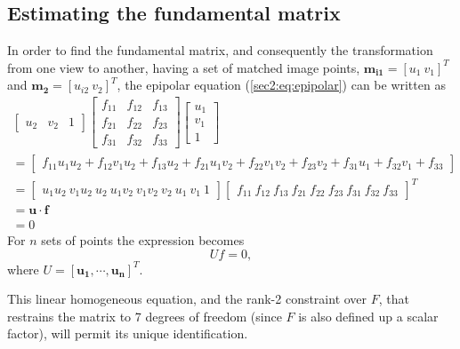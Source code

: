 \subsection{Estimating the fundamental matrix}
\label{einvonrev}
In order to find the fundamental matrix, and consequently the transformation from one view to another, having a set of matched image points, $\mathbf{m_{i1}} = [u_{1} \ v_{1}]^T$ and $\mathbf{m_{2}} = [u_{i2}  \ v_{2}]^T$, the epipolar equation (\ref{sec2:eq:epipolar}) can be written as
\begin{equation}
\begin{aligned}
\begin{bmatrix}
u_2 & v_2 & 1
\end{bmatrix}
\begin{bmatrix}
f_{11} & f_{12} & f_{13}  \\
f_{21} & f_{22} & f_{23}  \\
f_{31} & f_{32} & f_{33} 
\end{bmatrix}
\begin{bmatrix}
u_{1} \\ v_{1} \\ 1
\end{bmatrix}\\
=
\begin{bmatrix}
f_{11} u_1 u_2 + f_{12} v_1 u_2  + f_{13}u_2 + f_{21} u_1 v_2  + f_{22} v_1 v_2  + f_{23}v_2  + f_{31} u_1 + f_{32} v_1 + f_{33} 
\end{bmatrix}\\
=
\begin{bmatrix}
u_1u_2 \ v_1u_2 \ u_2 \ u_1v_2 \ v_1v_2 \  v_2 \ u_1 \ v_1 \ 1 
\end{bmatrix}
\begin{bmatrix}
f_{11} \ f_{12} \ f_{13} \ f_{21} \ f_{22} \ f_{23} \ f_{31} \ f_{32} \ f_{33}
\end{bmatrix}^T\\
= \mathbf{u} \cdot \mathbf{f}\\ = 0
\end{aligned}
\end{equation}
For $n$ sets of points the expression becomes 
\begin{equation}
\label{sec2:eq:nsets}
U f = 0,
\end{equation}
where $U = \left[ \mathbf{u_ { 1 }} , \cdots , \mathbf{u_ { n }} \right] ^ { T }$. 

This linear homogeneous equation, and the rank-2 constraint over $F$, that restrains the matrix to 7 degrees of freedom (since $F$ is also defined up a scalar factor), will permit its unique identification. 


